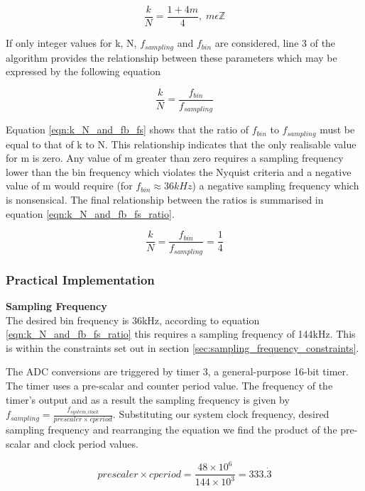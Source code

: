 \begin{equation}
\label{eqn:k_N_constraint}
\frac{k}{N} = \frac{1+4m}{4},\; m\epsilon \mathbb{Z}
\end{equation}

If only integer values for k, N, $f_{sampling}$ and $f_{bin}$ are considered, line 3 of the algorithm provides the relationship between these parameters which may be expressed by the following equation

\begin{equation}
\label{eqn:k_N_and_fb_fs}
\frac{k}{N} = \frac{f_{bin}}{f_{sampling}}
\end{equation}

Equation \ref{eqn:k_N_and_fb_fs} shows that the ratio of $f_{bin}$ to $f_{sampling}$ must be equal to that of k to N. This relationship indicates that the only realisable value for m is zero. Any value of m greater than zero requires a sampling frequency lower than the bin frequency which violates the Nyquist criteria and a negative value of m would require (for $f_{bin} \approx 36kHz$) a negative sampling frequency which is nonsensical. The final relationship between the ratios is summarised in equation \ref{eqn:k_N_and_fb_fs_ratio}.

\begin{equation}
\label{eqn:k_N_and_fb_fs_ratio}
\frac{k}{N} = \frac{f_{bin}}{f_{sampling}} = \frac{1}{4}
\end{equation}

\subsubsection{Practical Implementation}
\textbf{Sampling Frequency}\\
The desired bin frequency is 36kHz, according to equation \ref{eqn:k_N_and_fb_fs_ratio} this requires a sampling frequency of 144kHz. This is within the constraints set out in section \ref{sec:sampling_frequency_constraints}.

The ADC conversions are triggered by timer 3, a general-purpose 16-bit timer. The timer uses a pre-scalar and counter period value. The frequency of the timer's output and as a result the sampling frequency is given by \(f_{sampling} = \frac{f_{system\_clock}}{prescaler \times cperiod}\). Substituting our system clock frequency, desired sampling frequency and rearranging the equation we find the product of the pre-scalar and clock period values.

\[prescaler \times cperiod = \frac{48 \times 10^6}{144 \times 10^3} = 333.\dot{3}\]

